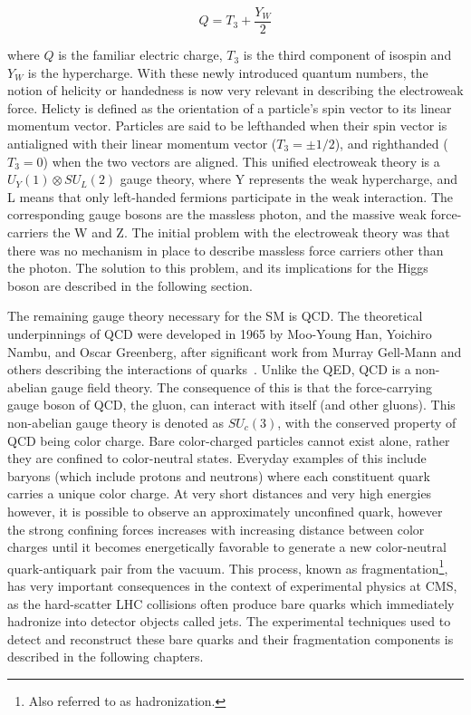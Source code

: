 \begin{equation}
\label{eqn:hypercharge}
Q = T_{3} + \frac{Y_{W}}{2}
\end{equation}
 
\noindent where $Q$ is the familiar electric charge, $T_{3}$ is the third component of isospin and $Y_{W}$ is the hypercharge. With these newly introduced quantum numbers,
the notion of helicity or handedness is now very relevant
in describing the electroweak force. Helicty is defined as the orientation of a particle's spin vector to its linear momentum vector. Particles are said to be lefthanded  when their spin vector is antialigned with
their linear momentum vector ($T_{3}=\pm 1/2$), and righthanded ($T_{3}=0$) when the two vectors are aligned.  
This unified electroweak theory is a
$U_{Y}(1) \otimes SU_{L}(2)$ gauge theory, where Y represents the weak hypercharge, and L means that only left-handed fermions participate in the weak interaction. 
The corresponding gauge bosons are the massless photon, and the massive weak force-carriers the W and Z. The initial problem with the electroweak theory was that there was no
mechanism in place to describe massless force carriers other than the photon. The solution to this problem, and its implications for the Higgs boson are described in the
following section.

The remaining gauge theory necessary for the SM is QCD. The theoretical underpinnings of QCD were developed in 1965 by Moo-Young Han, Yoichiro Nambu, and Oscar Greenberg, after
significant work from Murray Gell-Mann and others describing the interactions of quarks~\cite{NP69}.  
Unlike the QED, QCD is a non-abelian gauge field theory. The consequence of this is that the force-carrying gauge boson
of QCD, the gluon, can interact with itself (and other gluons). This non-abelian gauge theory is denoted as $SU_{c}(3)$, with the conserved property of QCD being color charge.
Bare color-charged particles
cannot exist alone, rather they are confined to color-neutral states. Everyday examples of this include baryons (which include protons and neutrons) where each constituent quark
carries a unique color charge. At very short distances and very high energies however, it is possible to observe an approximately unconfined quark, however the strong confining
forces increases with increasing distance between color charges until it becomes energetically favorable to generate a new color-neutral quark-antiquark pair from the vacuum.
This process, known as fragmentation\footnote{Also referred to as hadronization.}, has very important consequences in the context of experimental physics at CMS, as the hard-scatter LHC
collisions often produce bare quarks which immediately hadronize into detector objects called jets.
The experimental techniques used to detect and reconstruct these bare quarks and their fragmentation components is described in the following chapters. 

